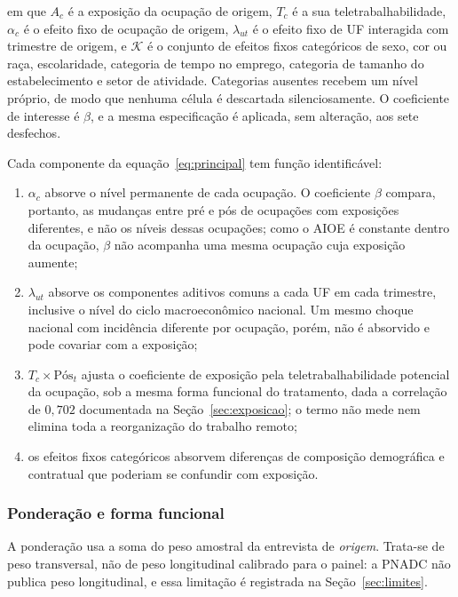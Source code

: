 em que $A_c$ é a exposição da ocupação de origem, $T_c$ é a sua
teletrabalhabilidade, $\alpha_c$ é o efeito fixo de ocupação de origem,
$\lambda_{ut}$ é o efeito fixo de UF interagida com trimestre de origem, e
$\mathcal{K}$ é o conjunto de efeitos fixos categóricos de sexo, cor ou raça,
escolaridade, categoria de tempo no emprego, categoria de tamanho do
estabelecimento e setor de atividade. Categorias ausentes recebem um nível
próprio, de modo que nenhuma célula é descartada silenciosamente. O coeficiente
de interesse é $\beta$, e a mesma especificação é aplicada, sem alteração, aos
sete desfechos.

Cada componente da equação~\eqref{eq:principal} tem função identificável:

\begin{enumerate}[label=\alph*)]
  \item $\alpha_c$ absorve o nível permanente de cada ocupação. O coeficiente
        $\beta$ compara, portanto, as mudanças entre pré e pós de ocupações com
        exposições diferentes, e não os níveis dessas ocupações; como o AIOE é
        constante dentro da ocupação, $\beta$ não acompanha uma mesma ocupação
        cuja exposição aumente;
  \item $\lambda_{ut}$ absorve os componentes aditivos comuns a cada UF em cada
        trimestre, inclusive o nível do ciclo macroeconômico nacional. Um mesmo
        choque nacional com incidência diferente por ocupação, porém, não é
        absorvido e pode covariar com a exposição;
  \item $T_c \times \text{Pós}_t$ ajusta o coeficiente de exposição pela
        teletrabalhabilidade potencial da ocupação, sob a mesma forma funcional
        do tratamento, dada a correlação de $0{,}702$ documentada na
        Seção~\ref{sec:exposicao}; o termo não mede nem elimina toda a
        reorganização do trabalho remoto;
  \item os efeitos fixos categóricos absorvem diferenças de composição
        demográfica e contratual que poderiam se confundir com exposição.
\end{enumerate}

\subsubsection{Ponderação e forma funcional}

A ponderação usa a soma do peso amostral da entrevista de \emph{origem}. Trata-se
de peso transversal, não de peso longitudinal calibrado para o painel: a PNADC
não publica peso longitudinal, e essa limitação é registrada na
Seção~\ref{sec:limites}.

